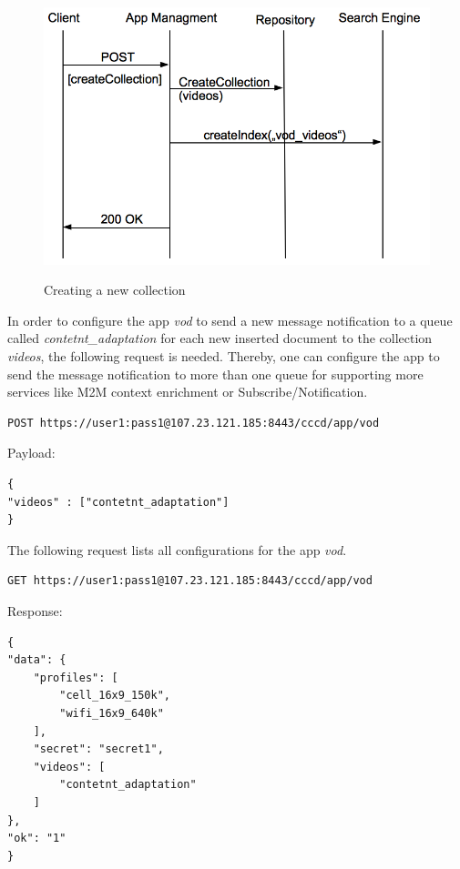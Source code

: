 \begin{figure}[htb]
  \centering
  \includegraphics[scale=0.6]{flows/newCollectionFlow.png}\\
  \caption{Creating a new collection}
  \label{fig:newCollection}
\end{figure}

In order to configure the app \textit{vod} to send a new message notification to a queue called \textit{contetnt\_adaptation} for each new inserted document to the collection \textit{videos}, the following request is needed. Thereby, one can configure the app to send the message notification to more than one queue for supporting more services like M2M context enrichment or Subscribe/Notification.

\begin{code}
\begin{verbatim}
POST https://user1:pass1@107.23.121.185:8443/cccd/app/vod
\end{verbatim}
Payload:
\begin{verbatim}
{
"videos" : ["contetnt_adaptation"]
}
\end{verbatim}
\end{code}

The following request lists all configurations for the app \textit{vod}.

\begin{code}
\begin{verbatim}
GET https://user1:pass1@107.23.121.185:8443/cccd/app/vod
\end{verbatim}
Response:
\begin{verbatim}
{
"data": {
	"profiles": [
		"cell_16x9_150k",
		"wifi_16x9_640k"
	],
	"secret": "secret1",
	"videos": [
		"contetnt_adaptation"
	]
},
"ok": "1"
}
\end{verbatim}
\end{code}

